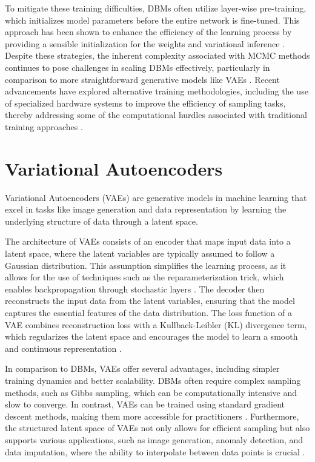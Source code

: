 To mitigate these training difficulties, DBMs often utilize layer-wise pre-training, which initializes model parameters 
before the entire network is fine-tuned. This approach has been shown to enhance the efficiency of the learning process
by providing a sensible initialization for the weights and variational inference \citep{10.1162/neco_a_00311}. Despite 
these strategies, the inherent complexity associated with MCMC methods continues to pose challenges in scaling DBMs 
effectively, particularly in comparison to more straightforward generative models like VAEs \citep{10.48550/arxiv.2303.10728}. 
Recent advancements have explored alternative training methodologies, including the use of specialized hardware systems to improve 
the efficiency of sampling tasks, thereby addressing some of the computational hurdles associated with traditional training approaches \citep{10.48550/arxiv.2303.10728}.



\section{Variational Autoencoders}
Variational Autoencoders (VAEs) are generative models in machine learning that excel in tasks like image generation and data 
representation by learning the underlying structure of data through a latent space. 

The architecture of VAEs consists of an encoder that maps input data into a latent space, where the latent variables are 
typically assumed to follow a Gaussian distribution. This assumption simplifies the learning process, as it allows for 
the use of techniques such as the reparameterization trick, which enables backpropagation through stochastic layers \citep{10.1561/2200000056}. 
The decoder then reconstructs the input data from the latent variables, ensuring that the model captures the essential 
features of the data distribution. The loss function of a VAE combines reconstruction loss with a Kullback-Leibler (KL) 
divergence term, which regularizes the latent space and encourages the model to learn a smooth and continuous representation \citep{10.3390/jimaging4020036}.

In comparison to DBMs, VAEs offer several advantages, including simpler training dynamics and better scalability. DBMs 
often require complex sampling methods, such as Gibbs sampling, which can be computationally intensive and slow to converge. 
In contrast, VAEs can be trained using standard gradient descent methods, making them more accessible for 
practitioners \citep{10.1561/2200000056}\citep{10.1109/access.2020.2977671}. Furthermore, the structured latent space of 
VAEs not only allows for efficient sampling but also supports various applications, such as image generation, anomaly detection, 
and data imputation, where the ability to interpolate between data points is crucial \citep{10.1088/2632-2153/ab80b7}\citep{10.48550/arxiv.2002.10464}.

